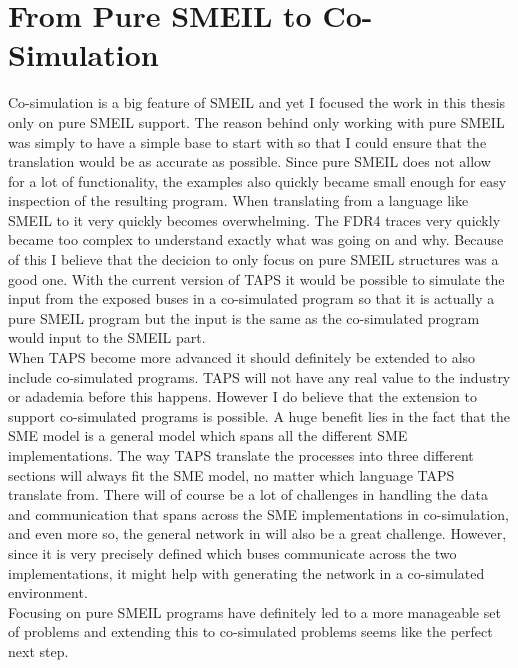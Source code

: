 \section{From Pure SMEIL to Co-Simulation}
Co-simulation is a big feature of SMEIL and yet I focused the work in this thesis only on pure SMEIL support. The reason behind only working with pure SMEIL was simply to have a simple base to start with so that I could ensure that the translation would be as accurate as possible. Since pure SMEIL does not allow for a lot of functionality, the examples also quickly became small enough for easy inspection of the resulting \cspm{} program. When translating from a language like SMEIL to \cspm{} it very quickly becomes overwhelming. The FDR4 traces very quickly became too complex to understand exactly what was going on and why. Because of this I believe that the decicion to only focus on pure SMEIL structures was a good one.
With the current version of TAPS it would be possible to simulate the input from the exposed buses in a co-simulated program so that it is actually a pure SMEIL program but the input is the same as the co-simulated program would input to the SMEIL part.\\

When TAPS become more advanced it should definitely be extended to also include co-simulated programs. TAPS will not have any real value to the industry or adademia before this happens. However I do believe that the extension to support co-simulated programs is possible. A huge benefit lies in the fact that the SME model is a general model which spans all the different SME implementations. The way TAPS translate the processes into three different sections will always fit the SME model, no matter which language TAPS translate from.
There will of course be a lot of challenges in handling the data and communication that spans across the SME implementations in co-simulation, and even more so, the general network in \cspm{} will also be a great challenge. However, since it is very precisely defined which buses communicate across the two implementations, it might help with generating the \cspm{} network in a co-simulated environment.\\

Focusing on pure SMEIL programs have definitely led to a more manageable set of problems and extending this to co-simulated problems seems like the perfect next step.

